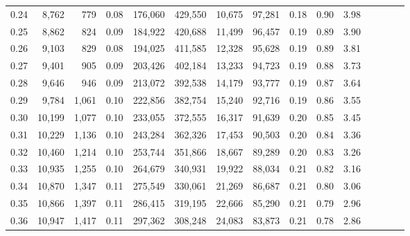 \begin{tabular}{rrrcrrrrrrrrrrr}
0.24 &   8,762 &    779 &                                       0.08 &  176,060 &  429,550 &   10,675 &   97,281 &  0.18 &  0.90 &                         3.98 \\
0.25 &   8,862 &    824 &                                       0.09 &  184,922 &  420,688 &   11,499 &   96,457 &  0.19 &  0.89 &                         3.90 \\
0.26 &   9,103 &    829 &                                       0.08 &  194,025 &  411,585 &   12,328 &   95,628 &  0.19 &  0.89 &                         3.81 \\
0.27 &   9,401 &    905 &                                       0.09 &  203,426 &  402,184 &   13,233 &   94,723 &  0.19 &  0.88 &                         3.73 \\
0.28 &   9,646 &    946 &                                       0.09 &  213,072 &  392,538 &   14,179 &   93,777 &  0.19 &  0.87 &                         3.64 \\
0.29 &   9,784 &  1,061 &                                       0.10 &  222,856 &  382,754 &   15,240 &   92,716 &  0.19 &  0.86 &                         3.55 \\
0.30 &  10,199 &  1,077 &                                       0.10 &  233,055 &  372,555 &   16,317 &   91,639 &  0.20 &  0.85 &                         3.45 \\
0.31 &  10,229 &  1,136 &                                       0.10 &  243,284 &  362,326 &   17,453 &   90,503 &  0.20 &  0.84 &                         3.36 \\
0.32 &  10,460 &  1,214 &                                       0.10 &  253,744 &  351,866 &   18,667 &   89,289 &  0.20 &  0.83 &                         3.26 \\
0.33 &  10,935 &  1,255 &                                       0.10 &  264,679 &  340,931 &   19,922 &   88,034 &  0.21 &  0.82 &                         3.16 \\
0.34 &  10,870 &  1,347 &                                       0.11 &  275,549 &  330,061 &   21,269 &   86,687 &  0.21 &  0.80 &                         3.06 \\
0.35 &  10,866 &  1,397 &                                       0.11 &  286,415 &  319,195 &   22,666 &   85,290 &  0.21 &  0.79 &                         2.96 \\
0.36 &  10,947 &  1,417 &                                       0.11 &  297,362 &  308,248 &   24,083 &   83,873 &  0.21 &  0.78 &                         2.86 \\

\end{tabular}
